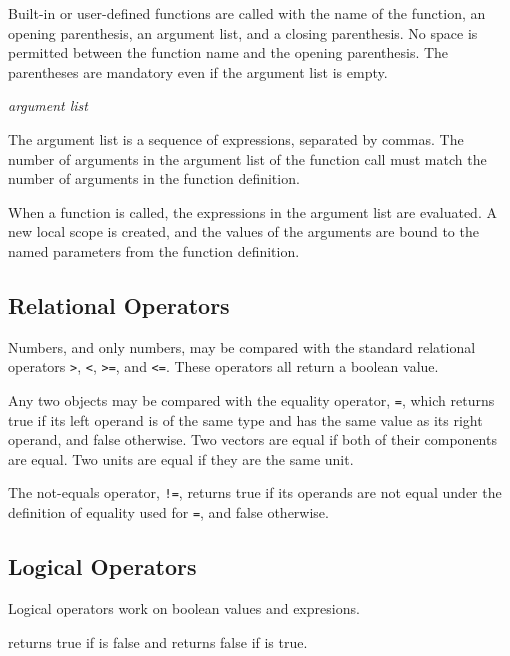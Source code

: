 Built-in or user-defined functions are called with the name of the
function, an opening parenthesis, an argument list, and a closing
parenthesis.  No space is permitted between the function name and the
opening parenthesis.  The parentheses are mandatory even if the
argument list is empty.


\begin{syntax}
\id{}\key{(} \textit{argument list} \key{)}
\end{syntax}

The argument list is a sequence of expressions, separated by commas.
The number of arguments in the argument list of the function call must
match the number of arguments in the function definition.

When a function is called, the expressions in the argument list are
evaluated.  A new local scope is created, and the values of the
arguments are bound to the named parameters from the function
definition.



\subsection{Relational Operators}

Numbers, and only numbers, may be compared with the standard
relational operators \verb|>|, \verb|<|, \verb|>=|, and \verb|<=|.
These operators all return a boolean value.

Any two objects may be compared with the equality operator, \verb|=|,
which returns true if its left operand is of the same type and has the
same value as its right operand, and false otherwise.  Two vectors are
equal if both of their components are equal.  Two units are equal if
they are the same unit.

The not-equals operator, \verb|!=|, returns true if its operands are
not equal under the definition of equality used for \verb|=|, and
false otherwise.



\subsection{Logical Operators}

Logical operators work on boolean values and expresions.

\begin{syntax}
 \expr{}
\end{syntax}
returns true if \expr{} is false and returns false if \expr{} is true.

